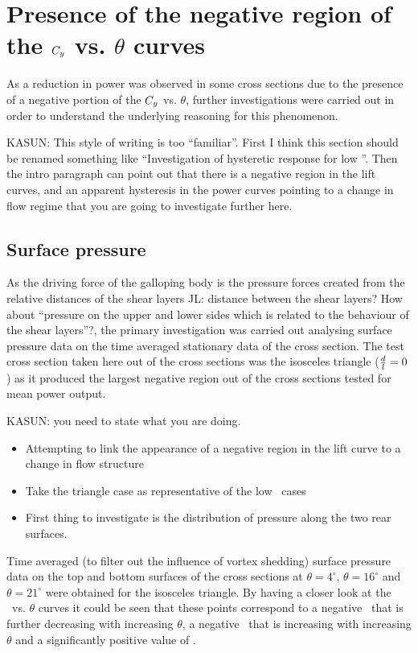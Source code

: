 \section{Presence of the negative region of the $C_{y}$ vs. $\theta$ curves}
 \label{sec:negative-region}

As a reduction in power was observed in some cross sections due to the presence of a negative portion of the $C_{y}$ vs. $\theta$, further investigations were carried out in order to understand the underlying reasoning for this phenomenon.

KASUN: This style of writing is too ``familiar''. First I think this section should be renamed something like ``Investigation of hysteretic response for low \ratio''. Then the intro paragraph can point out that there is a negative region in the lift curves, and an apparent hysteresis in the power curves pointing to a change in flow regime that you are going to investigate further here.

\subsection{Surface pressure}
\label{subsec:cross-sec-surface pressure}

As the driving force of the galloping body is the pressure forces created from the relative distances of the shear layers JL: distance between the shear layers? How about ``pressure on the upper and lower sides which is related to the behaviour of the shear layers''?, the primary investigation was carried out analysing surface pressure data on the time averaged stationary data of the cross section. The test cross section taken here out of the cross sections was the isosceles triangle ($\frac{d}{l}=0$) as it produced the largest negative region out of the cross sections tested for mean power output. 

KASUN: you need to state what you are doing.
\begin{itemize}
\item Attempting to link the appearance of a negative region in the
  lift curve to a change in flow structure
\item Take the triangle case as representative of the low \ratio\
  cases
\item First thing to investigate is the distribution of pressure along
  the two rear surfaces.
\end{itemize}

Time averaged (to filter out the influence of vortex shedding) surface pressure data  on the top and bottom surfaces of the cross sections at $\theta=4^{\circ}$, $\theta=16^{\circ}$ and $\theta=21^{\circ}$ were obtained for the isosceles triangle. By having a closer look at the \cy\ vs. $\theta$ curves it could be seen that these points correspond to a negative \cy\ that is further decreasing with increasing $\theta$, a negative \cy\ that is increasing with increasing $\theta$ and a significantly positive value of \cy.

